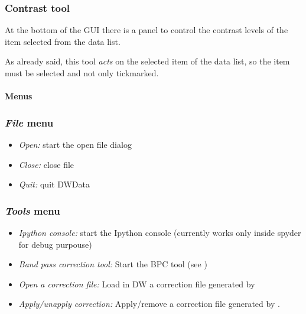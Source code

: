 \documentclass[letterpaper,10pt,english]{sphinxmanual}
\begin{document}
\subsubsection{Contrast tool}
\label{gui:contrast-tool}
At the bottom of the GUI there is a panel to control the contrast levels of the
item selected from the data list.

As already said, this tool \emph{acts} on the selected item of the data list, so the item must
be selected and not only tickmarked.


\paragraph{Menus}
\label{gui:menus}

\subsubsection{\emph{File} menu}
\label{gui:file-menu}\begin{itemize}
\item {} 
\emph{Open:} start the open file dialog

\item {} 
\emph{Close:} close file

\item {} 
\emph{Quit:} quit DWData

\end{itemize}


\subsubsection{\emph{Tools} menu}
\label{gui:tools-menu}\begin{itemize}
\item {} 
\emph{Ipython console:} start the Ipython console (currently works only inside spyder for debug purpouse)

\item {} 
\emph{Band pass correction tool:} Start the BPC tool (see {\hyperref[bpc::doc]{}})

\item {} 
\emph{Open a correction file:} Load in DW a correction file generated by {\hyperref[bpc::doc]{}}

\item {} 
\emph{Apply/unapply correction:} Apply/remove a correction file generated by {\hyperref[bpc::doc]{}}.

\end{itemize}
\end{document}
